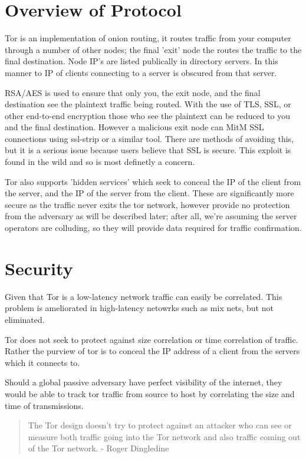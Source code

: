 \section{Overview of Protocol}
Tor is an implementation of onion routing, it routes traffic from your computer
through a number of other nodes; the final 'exit' node the routes the traffic
to the final destination\cite{torProtocol}. Node IP's are listed publically in
directory servers. In this manner to IP of clients connecting to a server is
obscured from that server.

RSA/AES is used to ensure that only you, the exit node, and the final
destination see the plaintext traffic being routed. With the use of TLS, SSL, or
other end-to-end encryption those who see the plaintext can be reduced to you
and the final destination. However a malicious exit node can MitM SSL connections
using ssl-strip or a similar tool. There are methods of avoiding this, but it is
a serious issue because users believe that SSL is secure. This exploit is found
in the wild\cite{badRelays} and so is most definetly a concern.

Tor also supports 'hidden services' which seek to conceal the IP of the client
from the server, and the IP of the server from the client. These are
significantly more secure as the traffic never exits the tor network, however
provide no protection from the adversary as will be described later; after all,
we're assuming the server operators are colluding, so they will provide data
required for traffic confirmation.

\section{Security}
Given that Tor is a low-latency network traffic can easily be correlated. This
problem is ameliorated in high-latency netowrks such as mix nets, but not
eliminated.

Tor does not seek to protect against size correlation or time correlation of
traffic. Rather the purview of tor is to conceal the IP address of a client from
the servers which it connects to.

Should a global passive adversary have perfect visibility of the internet, they
would be able to track tor traffic from source to host by correlating the size
and time of transmissions.

\begin{quote}
The Tor design doesn't try to protect against an attacker who can see or measure
both traffic going into the Tor network and also traffic coming out of the Tor
network\cite{torOneCell}. - Roger Dingledine
\end{quote}

